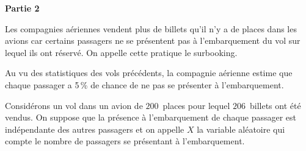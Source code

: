 \documentclass[11pt]{article}
\begin{document}
\textbf{Partie 2}

\medskip

Les compagnies aériennes vendent plus de billets qu'il n'y a de places dans les avions car certains passagers ne se présentent pas à l'embarquement du vol sur lequel ils ont réservé.
On appelle cette pratique le surbooking.

Au vu des statistiques des vols précédents, la compagnie aérienne estime que chaque passager a 5\,\% de chance de ne pas se présenter à l'embarquement.

Considérons un vol dans un avion de $200$~places pour lequel $206$~billets ont été vendus.
On suppose que la présence à l'embarquement de chaque passager est indépendante des autres passagers et on appelle $X$ la variable aléatoire qui compte le nombre de passagers se présentant à l'embarquement.

\medskip
\end{document}
